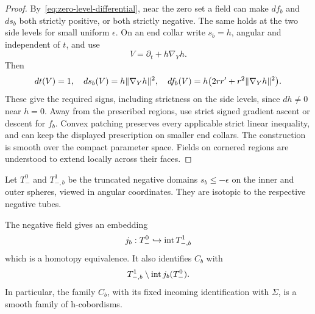 \begin{proof}
By~\eqref{eq:zero-level-differential}, near the zero set a field can make $df_b$ and $ds_b$ both strictly positive, or both strictly negative. The same holds at the two side levels for small uniform $\epsilon$. On an end collar write $s_b=h$, angular and independent of $t$, and use
\[
 V=\partial_t+h\nabla_Yh.
\]
Then
\[
 dt(V)=1,\quad ds_b(V)=h\lVert\nabla_Yh\rVert^2,\quad
 df_b(V)=h\bigl(2rr'+r^2\lVert\nabla_Yh\rVert^2\bigr).
\]
These give the required signs, including strictness on the side levels, since $dh\ne0$ near $h=0$. Away from the prescribed regions, use strict signed gradient ascent or descent for $f_b$. Convex patching preserves every applicable strict linear inequality, and can keep the displayed prescription on smaller end collars. The construction is smooth over the compact parameter space. Fields on cornered regions are understood to extend locally across their faces.
\end{proof}

Let $T_-^0$ and $T_{-,b}^1$ be the truncated negative domains $s_b\leq-\epsilon$ on the inner and outer spheres, viewed in angular coordinates. They are isotopic to the respective negative tubes.

\begin{lemma}\label{lem:residual-hcob}
The negative field gives an embedding
\[
 j_b:T_-^0\hookrightarrow\operatorname{int} T_{-,b}^1
\]
which is a homotopy equivalence. It also identifies $C_b$ with
\[
 T_{-,b}^1\setminus\operatorname{int} j_b(T_-^0).
\]
In particular, the family $C_b$, with its fixed incoming identification with $\Sigma$, is a smooth family of h-cobordisms.
\end{lemma}

